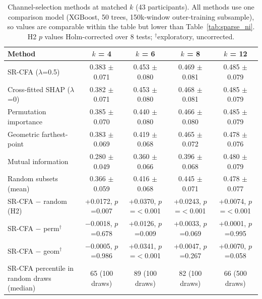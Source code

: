 \begin{table}[t]
\centering
\small
\caption{Channel-selection methods at matched $k$ (43 participants). All methods use one comparison model (XGBoost, 50 trees, 150k-window outer-training subsample), so values are comparable within the table but lower than Table~\ref{tab:sparse_ni}. H2 $p$ values Holm-corrected over 8 tests; $^\dagger$exploratory, uncorrected.}
\label{tab:baselines}
\begin{tabular}{lcccc}
\toprule
Method & $k$ = 4 & $k$ = 6 & $k$ = 8 & $k$ = 12 \\
\midrule
SR-CFA ($\lambda$=0.5) & 0.383 $\pm$ 0.071 & 0.453 $\pm$ 0.080 & 0.469 $\pm$ 0.081 & 0.485 $\pm$ 0.079 \\
Cross-fitted SHAP ($\lambda$=0) & 0.382 $\pm$ 0.071 & 0.453 $\pm$ 0.080 & 0.468 $\pm$ 0.081 & 0.485 $\pm$ 0.079 \\
Permutation importance & 0.385 $\pm$ 0.070 & 0.440 $\pm$ 0.080 & 0.466 $\pm$ 0.080 & 0.485 $\pm$ 0.079 \\
Geometric farthest-point & 0.383 $\pm$ 0.069 & 0.419 $\pm$ 0.068 & 0.465 $\pm$ 0.072 & 0.478 $\pm$ 0.076 \\
Mutual information & 0.280 $\pm$ 0.049 & 0.360 $\pm$ 0.066 & 0.396 $\pm$ 0.068 & 0.480 $\pm$ 0.079 \\
Random subsets (mean) & 0.366 $\pm$ 0.059 & 0.416 $\pm$ 0.068 & 0.445 $\pm$ 0.071 & 0.478 $\pm$ 0.077 \\
\midrule SR-CFA $-$ random (H2) & +0.0172, $p$=0.007 & +0.0370, $p$=$<$0.001 & +0.0243, $p$=$<$0.001 & +0.0074, $p$=$<$0.001 \\
SR-CFA $-$ perm$^\dagger$ & $-$0.0018, $p$=0.678 & +0.0126, $p$=0.009 & +0.0033, $p$=0.069 & +0.0001, $p$=0.995 \\
SR-CFA $-$ geom$^\dagger$ & $-$0.0005, $p$=0.986 & +0.0341, $p$=$<$0.001 & +0.0047, $p$=0.267 & +0.0070, $p$=0.058 \\
SR-CFA percentile in random draws (median) & 65 (100 draws) & 89 (100 draws) & 82 (100 draws) & 66 (500 draws) \\
\bottomrule
\end{tabular}
\end{table}
